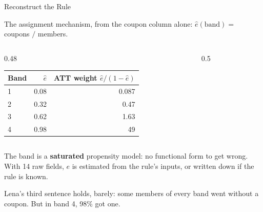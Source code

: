 \documentclass[aspectratio=169, 11pt, handout]{beamer}
\begin{document}
\begin{frame}{Reconstruct the Rule}

The assignment mechanism, from the coupon column alone: $\hat e(\text{band}) = $ coupons $/$ members.

\begin{columns}[T]
\begin{column}{0.48\textwidth}
\begin{center}
\small
\begin{tabular}{lrr}
\toprule
\textbf{Band} & $\hat e$ & \textbf{ATT weight $\hat e/(1-\hat e)$} \\
\midrule
1 & 0.08 & 0.087 \\
2 & 0.32 & 0.47 \\
3 & 0.62 & 1.63 \\
4 & 0.98 & 49 \\
\bottomrule
\end{tabular}
\end{center}
\end{column}
\begin{column}{0.5\textwidth}
\begin{center}
\end{center}
\end{column}
\end{columns}

The band is a \textbf{saturated} propensity model: no functional form to get wrong. With 14 raw fields, $e$ is estimated from the rule's inputs, or written down if the rule is known.

Lena's third sentence holds, barely: some members of every band went without a coupon. But in band 4, 98\% got one.
\end{frame}
\end{document}
